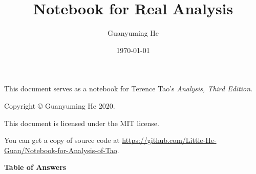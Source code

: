 \documentclass[11pt]{article}
\author{Guanyuming He}
\title{Notebook for Real Analysis}
\date{\today}
\begin{document}
\maketitle

\begin{center}
This document serves as a notebook for Terence Tao's \emph{Analysis, Third Edition}.
\end{center}

\vspace{\fill}

\begin{center}
Copyright \copyright{} Guanyuming He 2020. 

This document is licensed under the MIT license.

You can get a copy of source code at 
\url{https://github.com/Little-He-Guan/Notebook-for-Analysis-of-Tao}.
\end{center}

\newpage
{}
\tableofcontents

\newpage


\newpage
{}
\pagestyle{headings}



\newpage


\newpage


\newpage


\newpage


\newpage


\newpage
\pagestyle{myheadings}

\begin{center}
\begin{Large}
\textbf{Table of Answers}
\end{Large}
\end{center}
\end{document}
